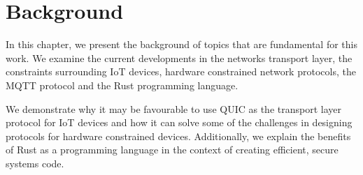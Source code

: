 \chapter{Background} \label{chap:back}

In this chapter, we present the background of topics that are fundamental for this work.
We examine the current developments in the networks transport layer, the constraints surrounding IoT devices, hardware constrained network protocols, the MQTT protocol and the Rust programming language.

We demonstrate why it may be favourable to use QUIC as the transport layer protocol for IoT devices and how it can solve some of the challenges in designing protocols for hardware constrained devices.
Additionally, we explain the benefits of Rust as a programming language in the context of creating efficient, secure systems code.





